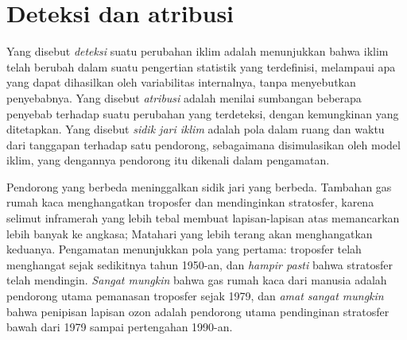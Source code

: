 \section{Deteksi dan atribusi}\label{sec:b2:anthropogenic-climate-change:attribution}

\begin{definition}\label{def:b2:anthropogenic-climate-change:da}
Yang disebut \emph{deteksi} suatu perubahan iklim adalah menunjukkan bahwa
iklim telah berubah dalam suatu pengertian statistik yang terdefinisi, melampaui apa yang dapat dihasilkan oleh variabilitas internalnya,
tanpa menyebutkan penyebabnya. Yang disebut \emph{atribusi} adalah menilai
sumbangan beberapa penyebab terhadap suatu perubahan yang terdeteksi, dengan kemungkinan yang ditetapkan. Yang disebut \emph{sidik jari
iklim} adalah pola dalam ruang dan waktu dari tanggapan terhadap satu
pendorong, sebagaimana disimulasikan oleh model iklim, yang dengannya pendorong itu dikenali dalam pengamatan.
\end{definition}

Pendorong yang berbeda meninggalkan sidik jari yang berbeda. Tambahan gas rumah kaca menghangatkan troposfer dan mendinginkan
stratosfer, karena selimut inframerah yang lebih tebal membuat lapisan-lapisan atas memancarkan lebih banyak ke angkasa;
Matahari yang lebih terang akan menghangatkan keduanya. Pengamatan menunjukkan pola yang pertama: troposfer telah menghangat
sejak sedikitnya tahun 1950-an, dan \emph{hampir pasti} bahwa stratosfer telah mendingin. \emph{Sangat
mungkin} bahwa gas rumah kaca dari manusia adalah pendorong utama pemanasan troposfer
sejak 1979, dan \emph{amat sangat mungkin} bahwa penipisan lapisan ozon adalah pendorong utama
pendinginan stratosfer bawah dari 1979 sampai pertengahan 1990-an.

